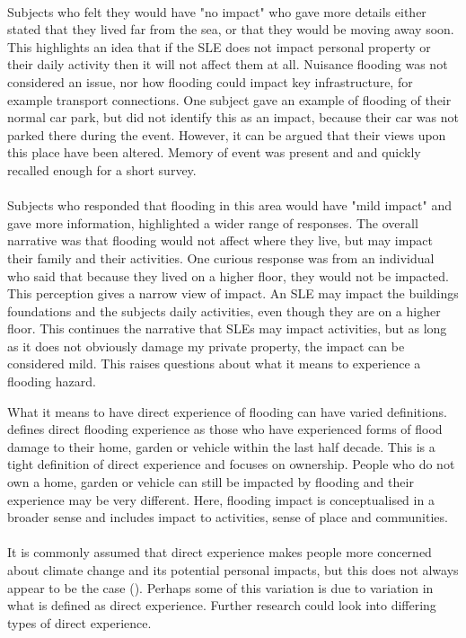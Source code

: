 \paragraph{}

Subjects who felt they would have "no impact" who gave more details either stated that they lived far from the sea, or that they would be moving away soon. This highlights an idea that if the SLE does not impact personal property or their daily activity then it will not affect them at all. Nuisance flooding was not considered an issue, nor how flooding could impact key infrastructure, for example transport connections. One subject gave an example of flooding of their normal car park, but did not identify this as an impact, because their car was not parked there during the event. However, it can be argued that their views upon this place have been altered. Memory of event was present and and quickly recalled enough for a short survey.  
\paragraph{}

Subjects who responded that flooding in this area would have "mild impact" and gave more information, highlighted a wider range of responses. The overall narrative was that flooding would not affect where they live, but may impact their family and their activities. One curious response was from an individual who said that because they lived on a higher floor, they would not be impacted. This perception gives a narrow view of impact. An SLE may impact the buildings foundations and the subjects daily activities, even though they are on a higher floor. This continues the narrative that SLEs may impact activities, but as long as it does not obviously damage my private property, the impact can be considered mild. This raises questions about what it means to experience a flooding hazard. 

What it means to have direct experience of flooding can have varied definitions. \cite{whitmarsh_are_2008} defines direct flooding experience as those who have experienced forms of flood damage to their home, garden or vehicle within the last half decade. This is a tight definition of direct experience and focuses on ownership. People who do not own a home, garden or vehicle can still be impacted by flooding and their experience may be very different. Here, flooding impact is conceptualised in a broader sense and includes impact to activities, sense of place and communities.   
\paragraph{}
It is commonly assumed that direct experience makes people more concerned about climate change and its potential personal impacts, but this does not always appear to be the case (\cite{lujala_role_2020}). Perhaps some of this variation is due to variation in what is defined as direct experience. Further research could look into differing types of direct experience. 
